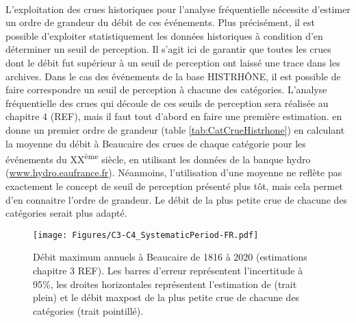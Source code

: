 \documentclass[11pt]{article}
\begin{document}
	\paragraph{} L'exploitation des crues historiques pour l'analyse fréquentielle nécessite d'estimer un ordre de grandeur du débit de ces événements. Plus précisément, il est possible d'exploiter statistiquement les données historiques à condition d'en déterminer un seuil de perception. Il s'agit ici de garantir que toutes les crues dont le débit fut supérieur à un seuil de perception ont laissé une trace dans les archives. Dans le cas des événements de la base HISTRHÔNE, il est possible de faire correspondre un seuil de perception à chacune des catégories. L'analyse fréquentielle des crues qui découle de ces seuils de perception sera réalisée au chapitre 4 (REF), mais il faut tout d'abord en faire une première estimation. \citet{pichard_hydro-climatology_2017} en donne un premier ordre de grandeur (table \ref{tab:CatCrueHistrhone}) en calculant la moyenne du débit à Beaucaire des crues de chaque catégorie pour les événements du XX\textsuperscript{ème} siècle, en utilisant les données de la banque hydro (\url{www.hydro.eaufrance.fr}). Néanmoins, l'utilisation d'une moyenne ne reflète pas exactement le concept de seuil de perception présenté plus tôt, mais cela permet d'en connaitre l'ordre de grandeur. Le débit de la plus petite crue de chacune des catégories serait plus adapté. 
	
	\begin{figure}[h]
	\centering
		\texttt{[image: Figures/C3-C4\_SystematicPeriod-FR.pdf]}
        \caption{Débit maximum annuels à Beaucaire de 1816 à 2020 (estimations chapitre 3 REF). Les barres d'erreur représentent l'incertitude à 95\%, les droites horizontales représentent l'estimation de \citet{pichard_hydro-climatology_2017} (trait plein) et le débit maxpost de la plus petite crue de chacune des catégories (trait pointillé).}
		\label{fig:C3-C4_Syst}
	\end{figure}
		
	
\end{document}
